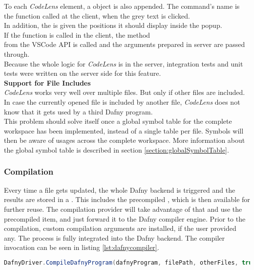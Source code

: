 To each \textit{CodeLens} element, a  object is also appended.
The command's name is the function called at the client, when the grey text is clicked.\\

In addition, the  is given the positions it should display inside the popup.  \\

If the function  is called in the client,
the method \\
 from the VSCode API is called
and the arguments prepared in server are passed through. \\

Because the whole logic for \textit{CodeLens} is in the server,
integration tests and unit tests were written on the server side for this feature.\\

\textbf{Support for File Includes} \\
\textit{CodeLens} works very well over multiple files.
But only if other files are included.
In case the currently opened file is included by another file,
\textit{CodeLens} does not know that it gets used by a third Dafny program. \\

This problem should solve itself once a global symbol table for the complete workspace has been implemented,
instead of a single table per file.
Symbols will then be aware of usages across the complete workspace.
More information about the global symbol table is described in section \ref{section:globalSymbolTable}.

\subsubsection{Compilation}
Every time a file gets updated, the whole Dafny backend is triggered and the results are stored in a .
This includes the precompiled , which is then available for further reuse.
The compilation provider will take advantage of that and use the precompiled item, and just forward it to the Dafny compiler engine.
Prior to the compilation, custom compilation arguments are installed, if the user provided any.
The process is fully integrated into the Dafny backend.
The compiler invocation can be seen in listing \ref{lst:dafnycompiler}.\\

\begin{lstlisting}[language=csharp, caption={Calling the Dafny Compiler}, captionpos=b, label={lst:dafnycompiler}]
DafnyDriver.CompileDafnyProgram(dafnyProgram, filePath, otherFiles, true, textWriter);
\end{lstlisting}

